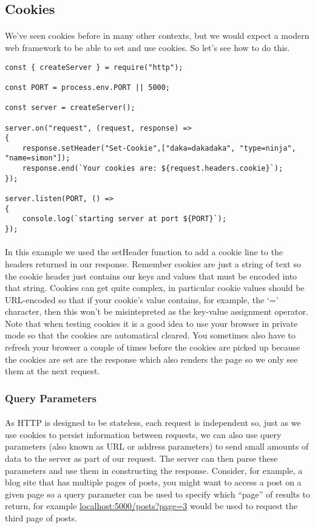 \documentclass[10pt, a4paper, twosize]{article}
\begin{document}
\subsection{Cookies}
\paragraph{} We've seen cookies before in many other contexts, but we would expect a modern web framework to be able to set and use cookies. So let's see how to do this.

\begin{lstlisting}
const { createServer } = require("http");

const PORT = process.env.PORT || 5000;

const server = createServer();

server.on("request", (request, response) => 
{
    response.setHeader("Set-Cookie",["daka=dakadaka", "type=ninja", "name=simon"]);
    response.end(`Your cookies are: ${request.headers.cookie}`); 
});

server.listen(PORT, () => 
{
    console.log(`starting server at port ${PORT}`);
});
\end{lstlisting}

\paragraph{} In this example we used the setHeader function to add a cookie line to the headers returned in our response. Remember cookies are just a string of text so the cookie header just contains our keys and values that must be encoded into that string. Cookies can get quite complex, in particular cookie values should be URL-encoded so that if your cookie's value contains, for example, the `=' character, then this won't be misintepreted as the key-value assignment operator. Note that when testing cookies it is a good idea to use your browser in private mode so that the cookies are automatical cleared. You sometimes also have to refresh your browser a couple of times before the cookies are picked up because the cookies are set are the response which also renders the page so we only see them at the next request.

\subsubsection{Query Parameters}
\paragraph{} As HTTP is designed to be stateless, each request is independent so, just as we use cookies to persist information between requests, we can also use query parameters (also known as URL or address parameters) to send small amounts of data to the server as part of our request. The server can then parse these parameters and use them in constructing the response. Consider, for example, a blog site that has multiple pages of posts, you might want to access a post on a given page so a query parameter can be used to specify which ``page'' of results to return, for example \url{localhost:5000/posts?page=3} would be used to request the third page of posts.
\end{document}
